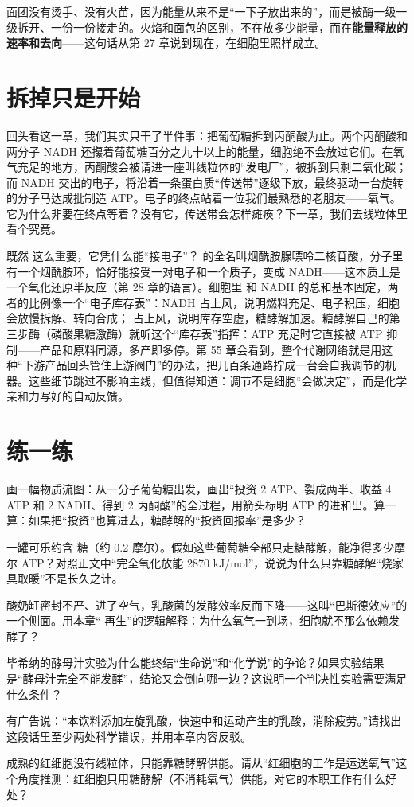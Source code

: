 面团没有烫手、没有火苗，因为能量从来不是“一下子放出来的”，而是被酶一级一级拆开、一份一份接走的。火焰和面包的区别，不在放多少能量，而在\textbf{能量释放的速率和去向}——这句话从第 27 章说到现在，在细胞里照样成立。

\section{拆掉只是开始}

回头看这一章，我们其实只干了半件事：把葡萄糖拆到丙酮酸为止。两个丙酮酸和两分子 NADH 还攥着葡萄糖百分之九十以上的能量，细胞绝不会放过它们。在氧气充足的地方，丙酮酸会被请进一座叫线粒体的“发电厂”，被拆到只剩二氧化碳；而 NADH 交出的电子，将沿着一条蛋白质“传送带”逐级下放，最终驱动一台旋转的分子马达成批制造 ATP。电子的终点站着一位我们最熟悉的老朋友——氧气。它为什么非要在终点等着？没有它，传送带会怎样瘫痪？下一章，我们去线粒体里看个究竟。

\begin{tiaozhan}
既然  这么重要，它凭什么能“接电子”？ 的全名叫烟酰胺腺嘌呤二核苷酸，分子里有一个烟酰胺环，恰好能接受一对电子和一个质子，变成 NADH——这本质上是一个氧化还原半反应（第 28 章的语言）。细胞里  和 NADH 的总和基本固定，两者的比例像一个“电子库存表”：NADH 占上风，说明燃料充足、电子积压，细胞会放慢拆解、转向合成； 占上风，说明库存空虚，糖酵解加速。糖酵解自己的第三步酶（磷酸果糖激酶）就听这个“库存表”指挥：ATP 充足时它直接被 ATP 抑制——产品和原料同源，多产即多停。第 55 章会看到，整个代谢网络就是用这种“下游产品回头管住上游阀门”的办法，把几百条通路拧成一台会自我调节的机器。这些细节跳过不影响主线，但值得知道：调节不是细胞“会做决定”，而是化学亲和力写好的自动反馈。
\end{tiaozhan}

\section*{练一练}

\begin{sikaoti}
\item 画一幅物质流图：从一分子葡萄糖出发，画出“投资 2 ATP、裂成两半、收益 4 ATP 和 2 NADH、得到 2 丙酮酸”的全过程，用箭头标明 ATP 的进和出。算一算：如果把“投资”也算进去，糖酵解的“投资回报率”是多少？
\item 一罐可乐约含  糖（约 0.2 摩尔）。假如这些葡萄糖全部只走糖酵解，能净得多少摩尔 ATP？对照正文中“完全氧化放能 2870 kJ/mol”，说说为什么只靠糖酵解“烧家具取暖”不是长久之计。
\item 酸奶缸密封不严、进了空气，乳酸菌的发酵效率反而下降——这叫“巴斯德效应”的一个侧面。用本章“ 再生”的逻辑解释：为什么氧气一到场，细胞就不那么依赖发酵了？
\item 毕希纳的酵母汁实验为什么能终结“生命说”和“化学说”的争论？如果实验结果是“酵母汁完全不能发酵”，结论又会倒向哪一边？这说明一个判决性实验需要满足什么条件？
\item 有广告说：“本饮料添加左旋乳酸，快速中和运动产生的乳酸，消除疲劳。”请找出这段话里至少两处科学错误，并用本章内容反驳。
\item 成熟的红细胞没有线粒体，只能靠糖酵解供能。请从“红细胞的工作是运送氧气”这个角度推测：红细胞只用糖酵解（不消耗氧气）供能，对它的本职工作有什么好处？
\end{sikaoti}
